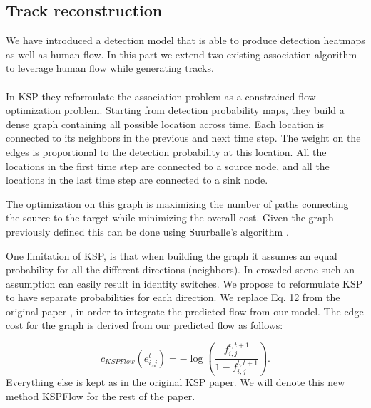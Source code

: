 \documentclass[10pt,twocolumn,letterpaper]{article}
\begin{document}
\subsection{Track reconstruction}
\label{sec:kspflow}
We have introduced a detection model that is able to produce detection heatmaps as well as human flow.
In this part we extend two existing association algorithm to leverage human flow while generating tracks.

\paragraph*{}
In KSP\cite{Berclaz11} they reformulate the association problem as a constrained flow optimization problem.
Starting from detection probability maps, they build a dense graph containing all possible location across time.
Each location is connected to its neighbors in the previous and next time step. 
The weight on the edges is proportional to the detection probability at this location.
All the locations in the first time step are connected to a source node, and all the locations in the last time step are connected to a sink node.

The optimization on this graph is maximizing the number of paths connecting the source to the target while minimizing the overall cost.
Given the graph previously defined this can be done using Suurballe's algorithm \cite{Suurballe74}.

One limitation of KSP, is that when building the graph it assumes an equal probability for all the different directions (neighbors).
In crowded scene such an assumption can easily result in identity switches.
We propose to reformulate KSP to have separate probabilities for each direction. We replace Eq. 12 from the original paper \cite{Berclaz11}, 
in order to integrate the predicted flow from our model.
The edge cost for the graph is derived from our predicted flow as follows:

\begin{equation}
    c_{KSPFlow}\left(e_{i, j}^{t}\right)=-\log \left(\frac{f_{i, j}^{t, t+1}}{1-f_{i, j}^{t, t+1}}\right).
    \label{eq:edge_cost_ksp}
\end{equation}
Everything else is kept as in the original KSP paper. We will denote this new method KSPFlow for the rest of the paper.
\end{document}

